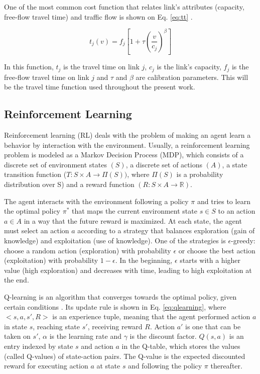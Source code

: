 \documentclass{RITA}
\newcommand{\travTime}{\ensuremath{t_j}} 	%
\newcommand{\fftt}{\ensuremath{f_j}} 		%
\newcommand{\linkCap}{\ensuremath{c_j}}		%
\newcommand{\veh}{\ensuremath{v}}		%
\begin{document}
One of the most common cost function that relates link's attributes (capacity, free-flow travel time) and traffic flow is shown on Eq. \eqref{eq:tt} \cite{Ortuzar&Willumsen2001}.

\begin{equation}
\label{eq:tt}
\travTime(\veh) = \fftt[1 + \tau \left(\frac{\veh}{\linkCap}\right)^\beta]
\end{equation}

In this function, $\travTime$ is the travel time on link $j$, $\linkCap$ is the link's capacity, $\fftt$ is the free-flow travel time on link $j$ and $\tau$ and $\beta$ are calibration parameters. This will be the travel time function used throughout the present work.

\subsection{Reinforcement Learning}
\label{sec:rl}
Reinforcement learning (RL) deals with the problem of making an agent learn a behavior by interaction with the environment. Usually, a reinforcement learning problem is modeled as a Markov Decision Process (MDP), which consists of a discrete set of environment states $(S)$, a discrete set of actions $(A)$, a state transition function ($T: S \times A \to \Pi(S))$, where $\Pi(S)$ is a probability distribution over S) and a reward function $(R: S \times A \to \mathbb{R})$. %

The agent interacts with the environment following a policy $\pi$ and tries to learn the optimal policy $\pi^*$ that maps the current environment state $s \in S$ to an action $a \in A$ in a way that the future reward is maximized. At each state, the agent must select an action $a$ according to a strategy that balances exploration (gain of knowledge) and exploitation (use of knowledge). One of the strategies is $\epsilon$-greedy: choose a random action (exploration) with probability $\epsilon$ or choose the best action (exploitation) with probability $1 - \epsilon$. In the beginning, $\epsilon$ starts with a higher value (high exploration) and decreases with time, leading to high exploitation at the end.

Q-learning is an algorithm that converges towards the optimal policy, given certain conditions \cite{Watkins&Dayan1992}. Its update rule is shown in Eq. \eqref{eq:qlearning}, where $<s,a,s',R>$ is an experience tuple, meaning that the agent performed action $a$ in state $s$, reaching state $s'$, receiving reward $R$. Action $a'$ is one that can be taken on $s'$, $\alpha$ is the learning rate and $\gamma$ is the discount factor. $Q(s,a)$ is an entry indexed by state $s$ and action $a$ in the Q-table, which stores the values (called Q-values) of state-action pairs. The Q-value is the expected discounted reward for executing action $a$ at
state $s$ and following the policy $\pi$ thereafter.
\end{document}

